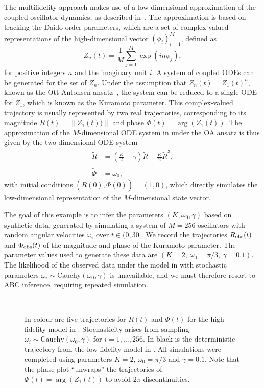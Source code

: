 \documentclass[review]{siamonline190516}
\begin{document}
The multifidelity approach makes use of a low-dimensional approximation of the coupled oscillator dynamics, as described in~\cite{Hannay2018,Ott2008,Ott2009}.
The approximation is based on tracking the Daido order parameters, which are a set of complex-valued representations of the high-dimensional vector $(\phi_i)_{i=1}^M$, defined as
\[
 Z_n(t) = \frac{1}{M} \sum_{j=1}^M \exp( i n \phi_j),
\]
for positive integers $n$ and the imaginary unit $i$.
A system of coupled ODEs can be generated for the set of $Z_n$.
Under the assumption that $Z_n(t) = Z_1(t)^n$, known as the Ott-Antonsen ansatz~\cite{Hannay2018,Ott2008}, the system can be reduced to a single ODE for $Z_1$, which is known as the Kuramoto parameter.
This complex-valued trajectory is usually represented by two real trajectories, corresponding to its magnitude $R(t) = \| Z_1(t)) \|$ and phase $\Phi(t) = \arg(Z_1(t))$.
The approximation of the $M$-dimensional ODE system in  under the OA ansatz is thus given by the two-dimensional ODE system
\begin{subequations}
\label{eq:Kuramoto_lo}
\begin{align}
 \dot{\tilde R} &= \left( \frac{K}{2} - \gamma \right) \tilde R - \frac{K}{2} \tilde R^3, \\
 \dot{\tilde \Phi} &= \omega_0,
\end{align}
\end{subequations}
with initial conditions $(\tilde R(0), \tilde \Phi(0)) = (1, 0)$, which directly simulates the low-dimensional representation of the $M$-dimensional state vector.

The goal of this example is to infer the parameters $(K, \omega_0, \gamma)$ based on synthetic data, generated by simulating a system of $M=256$ oscillators with random angular velocities $\omega_i$ over $t \in (0, 30]$.
We record the trajectories $R_{\mathrm{obs}}(t)$ and $\Phi_{\mathrm{obs}}(t)$ of the magnitude and phase of the Kuramoto parameter.
The parameter values used to generate these data are $(K=2,~\omega_0 = \pi/3,~\gamma=0.1)$.
The likelihood of the observed data under the model in  with stochastic parameters $\omega_i \sim \mathrm{Cauchy}(\omega_0, \gamma)$ is unavailable, and we must therefore resort to ABC inference, requiring repeated simulation.

\begin{figure}
    \centering
    ~
    \caption{
    In colour are five trajectories for $R(t)$ and $\Phi(t)$ for the high-fidelity model in . Stochasticity arises from sampling $\omega_i \sim \mathrm{Cauchy}(\omega_0, \gamma)$ for $i = 1,\dots, 256$. 
    In black is the deterministic trajectory from the low-fidelity model in .
    All simulations were completed using parameters $K=2$, $\omega_0 = \pi/3$ and $\gamma=0.1$.
    Note that the phase plot ``unwraps'' the trajectories of $\Phi(t) = \arg(Z_1(t))$ to avoid $2\pi$-discontinuities. 
    }
    \label{fig:eg_dynamics}
\end{figure}
\end{document}

